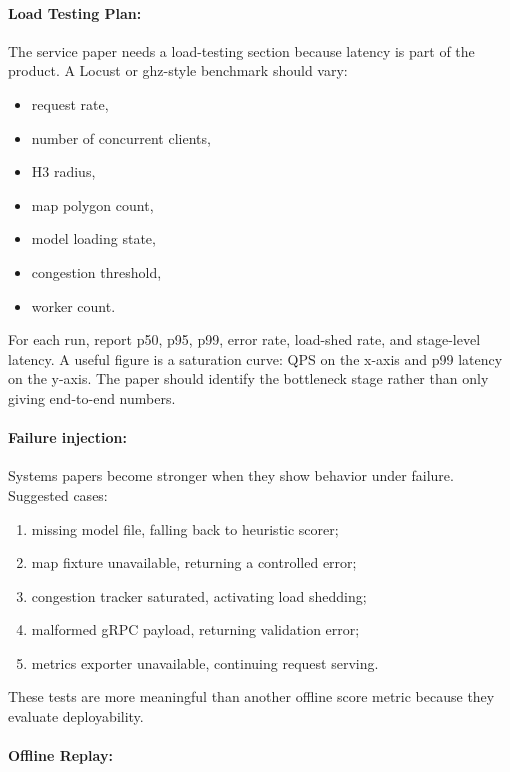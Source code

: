 \documentclass{article}
\begin{document}
\paragraph{Load Testing Plan:}

The service paper needs a load-testing section because latency is part of the product. A Locust or ghz-style benchmark should vary:
\begin{itemize}
  \item request rate,
  \item number of concurrent clients,
  \item H3 radius,
  \item map polygon count,
  \item model loading state,
  \item congestion threshold,
  \item worker count.
\end{itemize}
For each run, report p50, p95, p99, error rate, load-shed rate, and stage-level latency. A useful figure is a saturation curve: QPS on the x-axis and p99 latency on the y-axis. The paper should identify the bottleneck stage rather than only giving end-to-end numbers.

\paragraph{Failure injection:}

Systems papers become stronger when they show behavior under failure. Suggested cases:
\begin{enumerate}
  \item missing model file, falling back to heuristic scorer;
  \item map fixture unavailable, returning a controlled error;
  \item congestion tracker saturated, activating load shedding;
  \item malformed gRPC payload, returning validation error;
  \item metrics exporter unavailable, continuing request serving.
\end{enumerate}
These tests are more meaningful than another offline score metric because they evaluate deployability.

\paragraph{Offline Replay:}
\end{document}
